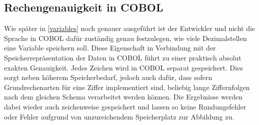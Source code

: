 \subsection*{Rechengenauigkeit in COBOL}
Wie später in \autoref{variables} noch genauer ausgeführt ist der Entwickler und nicht die Sprache in COBOL dafür zuständig genau festzulegen, wie viele Dezimalstellen eine Variable speichern soll. Diese Eigenschaft in Verbindung mit der Speicherrepräsentation der Daten in COBOL führt zu einer praktisch absolut exakten Genauigkeit. %
Jedes Zeichen wird in COBOL separat gespeichert. Dies sorgt neben höherem Speicherbedarf, jedoch auch dafür, dass sofern Grundrechenarten für eine Ziffer implementiert sind, beliebig lange Ziffernfolgen nach dem gleichen Schema verarbeitet werden können. Die Ergebnisse werden dabei wieder auch zeichenweise gespeichert und lassen so keine Rundungsfehler oder Fehler aufgrund von unzureichendem Speicherplatz zur Abbildung zu.